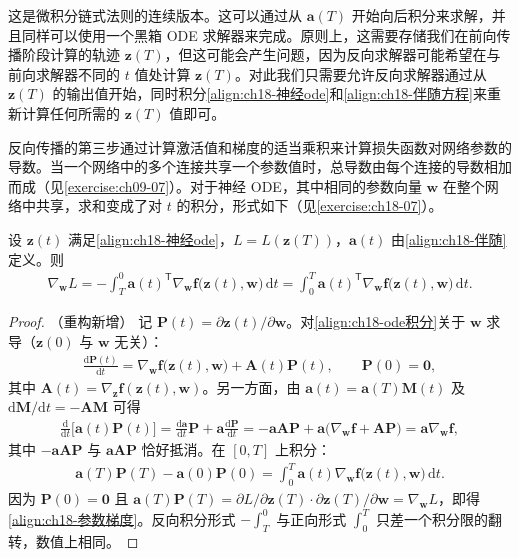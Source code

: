\documentclass[../../main.tex]{subfiles}
\begin{document}
这是微积分链式法则的连续版本。这可以通过从 $\bm{a}(T)$ 开始向后积分来求解，并且同样可以使用一个黑箱 ODE 求解器来完成。原则上，这需要存储我们在前向传播阶段计算的轨迹 $\bm{z}(T)$，但这可能会产生问题，因为反向求解器可能希望在与前向求解器不同的 $t$ 值处计算 $\bm{z}(T)$。对此我们只需要允许反向求解器通过从 $\bm{z}(T)$ 的输出值开始，同时积分\eqref{align:ch18-神经ode}和\eqref{align:ch18-伴随方程}来重新计算任何所需的 $\bm{z}(T)$ 值即可。

反向传播的第三步通过计算激活值和梯度的适当乘积来计算损失函数对网络参数的导数。当一个网络中的多个连接共享一个参数值时，总导数由每个连接的导数相加而成（见\cref{exercise:ch09-07}）。对于神经 ODE，其中相同的参数向量 $\bm{w}$ 在整个网络中共享，求和变成了对 $t$ 的积分，形式如下（见\cref{exercise:ch18-07}）。

\begin{proposition}[参数梯度]\label{proposition:ch18-参数梯度}
设 $\bm{z}(t)$ 满足\eqref{align:ch18-神经ode}，$L=L(\bm{z}(T))$，$\bm{a}(t)$ 由\eqref{align:ch18-伴随}定义。则
\begin{align}
  \nabla_{\bm{w}}L=-\int_{T}^{0}\bm{a}(t)^{\mathsf T}\nabla_{\bm{w}}\bm{f}\big(\bm{z}(t),\bm{w}\big)\,\mathrm{d}t
  =\int_{0}^{T}\bm{a}(t)^{\mathsf T}\nabla_{\bm{w}}\bm{f}\big(\bm{z}(t),\bm{w}\big)\,\mathrm{d}t .\label{align:ch18-参数梯度}
\end{align}
\end{proposition}

\begin{proof}（重构新增）
记 $\bm{P}(t)=\partial\bm{z}(t)/\partial\bm{w}$。对\eqref{align:ch18-ode积分}关于 $\bm{w}$ 求导（$\bm{z}(0)$ 与 $\bm{w}$ 无关）：
\begin{align*}
  \frac{\mathrm{d}\bm{P}(t)}{\mathrm{d}t}=\nabla_{\bm{w}}\bm{f}\big(\bm{z}(t),\bm{w}\big)+\bm{A}(t)\bm{P}(t),\qquad \bm{P}(0)=\bm{0},
\end{align*}
其中 $\bm{A}(t)=\nabla_{\bm{z}}\bm{f}(\bm{z}(t),\bm{w})$。另一方面，由 $\bm{a}(t)=\bm{a}(T)\bm{M}(t)$ 及 $\mathrm{d}\bm{M}/\mathrm{d}t=-\bm{A}\bm{M}$ 可得
\begin{align*}
  \frac{\mathrm{d}}{\mathrm{d}t}\Big[\bm{a}(t)\bm{P}(t)\Big]=\frac{\mathrm{d}\bm{a}}{\mathrm{d}t}\bm{P}+\bm{a}\frac{\mathrm{d}\bm{P}}{\mathrm{d}t}
  =-\bm{a}\bm{A}\bm{P}+\bm{a}\big(\nabla_{\bm{w}}\bm{f}+\bm{A}\bm{P}\big)=\bm{a}\nabla_{\bm{w}}\bm{f},
\end{align*}
其中 $-\bm{a}\bm{A}\bm{P}$ 与 $\bm{a}\bm{A}\bm{P}$ 恰好抵消。在 $[0,T]$ 上积分：
\begin{align*}
  \bm{a}(T)\bm{P}(T)-\bm{a}(0)\bm{P}(0)=\int_{0}^{T}\bm{a}(t)\nabla_{\bm{w}}\bm{f}\big(\bm{z}(t),\bm{w}\big)\,\mathrm{d}t .
\end{align*}
因为 $\bm{P}(0)=\bm{0}$ 且 $\bm{a}(T)\bm{P}(T)=\partial L/\partial\bm{z}(T)\cdot\partial\bm{z}(T)/\partial\bm{w}=\nabla_{\bm{w}}L$，即得\eqref{align:ch18-参数梯度}。反向积分形式 $-\int_{T}^{0}$ 与正向形式 $\int_{0}^{T}$ 只差一个积分限的翻转，数值上相同。
\end{proof}
\end{document}
